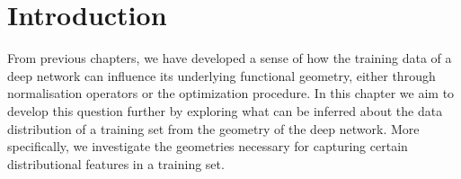 \section{Introduction}

From previous chapters, we have developed a sense of how the training data of a deep network can influence its underlying functional geometry, either through normalisation operators or the optimization procedure. In this chapter we aim to develop this question further by exploring what can be inferred about the data distribution of a training set from the geometry of the deep network. More specifically, we investigate the geometries necessary for capturing certain distributional features in a training set.